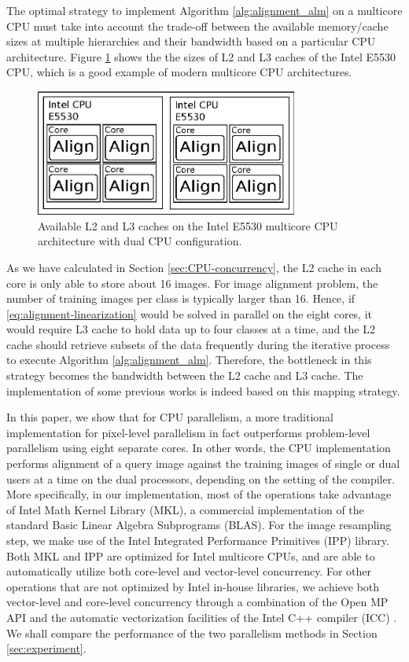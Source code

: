 \documentclass[10pt,twocolumn,letterpaper]{article}
\begin{document}
The optimal strategy to implement Algorithm \ref{alg:alignment_alm} on a multicore CPU must take into account
the trade-off between the available memory/cache sizes at multiple hierarchies and their bandwidth based on a particular
CPU architecture. Figure \ref{fig:alignment_mapping_old} shows the the sizes of L2 and L3 caches of the Intel E5530 CPU, 
which is a good example of modern multicore CPU architectures. 
\begin{figure}
\centering
\includegraphics[width=3.4in]{figures/alignment_mapping_old}
\caption{Available L2 and L3 caches on the Intel E5530 multicore CPU architecture with dual CPU configuration.}
\label{fig:alignment_mapping_old}
\end{figure}

As we have calculated in Section \ref{sec:CPU-concurrency}, the L2 cache in each core is only able to store about 16 images. For image alignment problem, the number of training images per class is typically larger than 16. Hence, if \eqref{eq:alignment-linearization} would be solved in parallel on the eight cores, it would require L3 cache to hold data up to four classes at a time, and the L2 cache should retrieve subsets of the data frequently during the iterative process to execute Algorithm \ref{alg:alignment_alm}. Therefore, the bottleneck in this strategy becomes the bandwidth between the L2 cache and L3 cache. The implementation of some previous works \cite{WagnerA2009-CVPR,WagnerA2011-PAMI} is indeed based on this mapping strategy.

In this paper, we show that for CPU parallelism, a more traditional implementation for pixel-level parallelism in fact outperforms problem-level parallelism using eight separate cores. In other words, the CPU implementation performs alignment of a query image against the training images of single or dual users at a time on the dual processors, depending on the setting of the compiler. More specifically, in our implementation, most of the operations take advantage of Intel Math Kernel Library (MKL), a commercial implementation of the standard Basic Linear Algebra Subprograms (BLAS). For the image resampling step, we make use of the Intel Integrated Performance Primitives (IPP) library. Both MKL and IPP are optimized for Intel multicore CPUs, and are able to automatically utilize both core-level and vector-level concurrency. For other operations that are not optimized by Intel in-house libraries, we achieve both vector-level and core-level concurrency through a combination of the Open MP API \cite{dagum2002openmp} and the automatic vectorization facilities of the Intel C++ compiler (ICC) \cite{dulong1999overview}. We shall compare the performance of the two parallelism methods in Section \ref{sec:experiment}.
\end{document}
